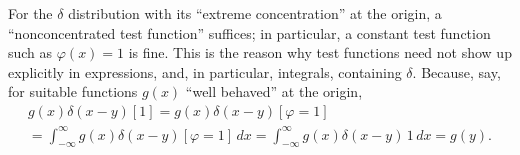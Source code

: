 For the $\delta$ distribution with its ``extreme concentration'' at the origin, a ``nonconcentrated test function'' suffices; in particular, a constant test function
such as $\varphi (x) = 1$ is fine.
This is the reason why test functions need not show up explicitly in expressions, and, in particular, integrals, containing $\delta$.
Because, say, for suitable functions $g(x)$ ``well behaved'' at the origin,
 \begin{equation}
 \begin{split}
g(x)\delta(x-y)[1]=g(x)\delta(x-y)[\varphi =1] \\
=\int_{-\infty}^{\infty} g(x)\delta(x-y)[\varphi =1]\,dx = \int_{-\infty}^{\infty} g(x)\delta(x-y)\,1 \,dx =g(y).
  \end{split}
\end{equation}

